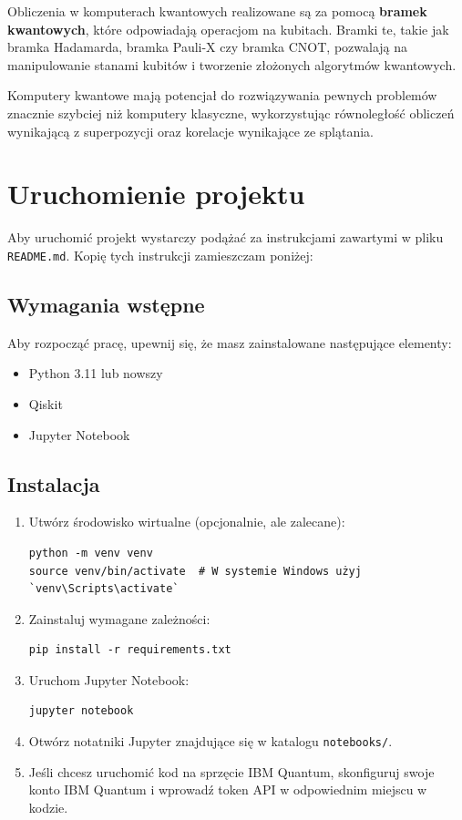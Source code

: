 \documentclass[a4paper,12pt]{article}
\begin{document}
Obliczenia w komputerach kwantowych realizowane są za pomocą 
\textbf{bramek kwantowych}, które odpowiadają operacjom na kubitach. 
Bramki te, takie jak bramka Hadamarda, bramka Pauli-X czy bramka CNOT, 
pozwalają na manipulowanie stanami kubitów i tworzenie złożonych algorytmów 
kwantowych.

Komputery kwantowe mają potencjał do rozwiązywania pewnych problemów znacznie 
szybciej niż komputery klasyczne, wykorzystując równoległość obliczeń 
wynikającą z superpozycji oraz korelacje wynikające ze splątania.

\section{Uruchomienie projektu}

Aby uruchomić projekt wystarczy podążać za instrukcjami zawartymi w pliku 
\texttt{README.md}. Kopię tych instrukcji zamieszczam poniżej:


\subsection{Wymagania wstępne}

Aby rozpocząć pracę, upewnij się, że masz zainstalowane następujące elementy:

\begin{itemize}
    \item Python 3.11 lub nowszy
    \item Qiskit
    \item Jupyter Notebook
\end{itemize}

\subsection{Instalacja}

\begin{enumerate}
    \item Utwórz środowisko wirtualne (opcjonalnie, ale zalecane):
    \begin{verbatim}
python -m venv venv
source venv/bin/activate  # W systemie Windows użyj `venv\Scripts\activate`
    \end{verbatim}

    \item Zainstaluj wymagane zależności:
    \begin{verbatim}
pip install -r requirements.txt
    \end{verbatim}

    \item Uruchom Jupyter Notebook:
    \begin{verbatim}
jupyter notebook
    \end{verbatim}

    \item Otwórz notatniki Jupyter znajdujące się w katalogu \texttt{notebooks/}.

    \item Jeśli chcesz uruchomić kod na sprzęcie IBM Quantum, skonfiguruj swoje
     konto IBM Quantum i wprowadź token API w odpowiednim miejscu w kodzie.
\end{enumerate}
\end{document}
